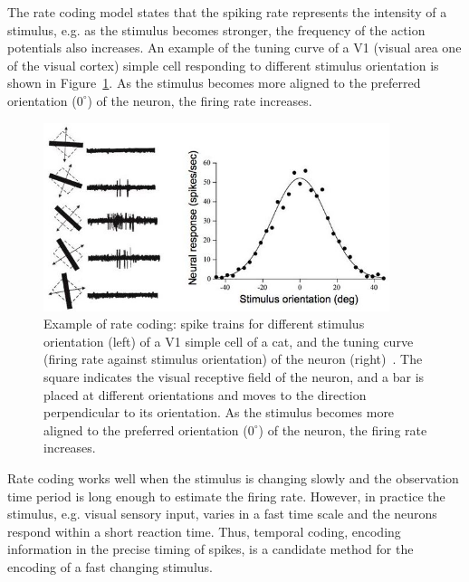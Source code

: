 The rate coding model states that the spiking rate represents the intensity of a stimulus, e.g. as the stimulus becomes stronger, the frequency of the action potentials also increases.
An example of the tuning curve of a V1 (visual area one of the visual cortex) simple cell responding to different stimulus orientation is shown in Figure~\ref{Fig:v1}.
As the stimulus becomes more aligned to the preferred orientation ($0^\circ$) of the neuron, the firing rate increases.

\begin{figure}[bt]
	\centering
	\includegraphics[width=0.9\textwidth]{pics_snn/v1.jpg}
	\caption{Example of rate coding: spike trains for different stimulus orientation (left) of a V1 simple cell of a cat, and the tuning curve (firing rate against stimulus orientation) of the neuron (right)~\citep{hubel1962receptive}.
	The square indicates the visual receptive field of the neuron, and a bar is placed at different orientations and moves to the direction perpendicular to its orientation.
    As the stimulus becomes more aligned to the preferred orientation ($0^\circ$) of the neuron, the firing rate increases.}
	\label{Fig:v1}
\end{figure}

Rate coding works well when the stimulus is changing slowly and the observation time period is long enough to estimate the firing rate.
However, in practice the stimulus, e.g. visual sensory input, varies in a fast time scale and the neurons respond within a short reaction time.
Thus, temporal coding, encoding information in the precise timing of spikes, is a candidate method for the encoding of a fast changing stimulus.

